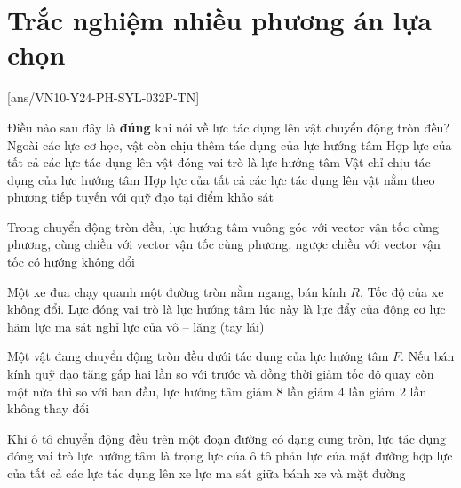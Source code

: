 \let\lesson\undefined
\newcommand{\lesson}{\phantomlesson{Bài 21.}}
\setcounter{section}{2}

\section{Trắc nghiệm nhiều phương án lựa chọn}
\setcounter{ex}{0}
[ans/VN10-Y24-PH-SYL-032P-TN]
\begin{ex}
Điều nào sau đây là \textbf{đúng} khi nói về lực tác dụng lên vật chuyển động tròn đều?	
	\choice
	{Ngoài các lực cơ học, vật còn chịu thêm tác dụng của lực hướng tâm}
	{\True Hợp lực của tất cả các lực tác dụng lên vật đóng vai trò là lực hướng tâm}
	{Vật chỉ chịu tác dụng của lực hướng tâm}
	{Hợp lực của tất cả các lực tác dụng lên vật nằm theo phương tiếp tuyến với quỹ đạo tại điểm khảo sát}
	\loigiai{}
\end{ex}
\begin{ex}
	Trong chuyển động tròn đều, lực hướng tâm
	\choice
	{\True vuông góc với vector vận tốc}
	{cùng phương, cùng chiều với vector vận tốc}
	{cùng phương, ngược chiều với vector vận tốc}
	{có hướng không đổi}
	\loigiai{}
\end{ex}
\begin{ex}
Một xe đua chạy quanh một đường tròn nằm ngang, bán kính $R$. Tốc độ của xe không đổi. Lực đóng vai trò là lực hướng tâm lúc này là	
	\choice
	{lực đẩy của động cơ}
	{lực hãm}
	{\True lực ma sát nghỉ}
	{lực của vô – lăng (tay lái)}
	\loigiai{}
\end{ex}
\begin{ex}
Một vật đang chuyển động tròn đều dưới tác dụng của lực hướng tâm $F$. Nếu bán kính quỹ đạo tăng gấp hai lần so với trước và đồng thời giảm tốc độ quay còn một nửa thì so với ban đầu, lực hướng tâm	
	\choice
	{\True giảm 8 lần}
	{giảm 4 lần}
	{giảm 2 lần}
	{không thay đổi}
\end{ex}
\begin{ex}
	Khi ô tô chuyển động đều trên một đoạn đường có dạng cung tròn, lực tác dụng đóng vai trò lực hướng tâm là
	\choice
	{trọng lực của ô tô}
	{phản lực của mặt đường}
	{\True hợp lực của tất cả các lực tác dụng lên xe}
	{lực ma sát giữa bánh xe và mặt đường}
\end{ex}
